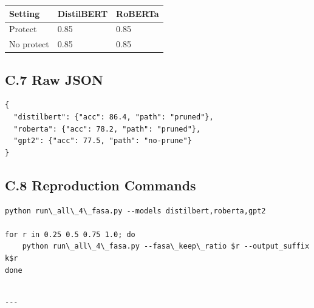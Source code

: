 \begin{table}[H]
\centering
\small
\begin{tabular}{lll}
\toprule
\textbf{Setting} & \textbf{DistilBERT} & \textbf{RoBERTa} \\
\midrule
Protect & 0.85 & 0.85 \\
No protect & 0.85 & 0.85 \\
\bottomrule
\end{tabular}
\end{table}

\subsection{C.7 Raw JSON}

\begin{lstlisting}
{
  "distilbert": {"acc": 86.4, "path": "pruned"},
  "roberta": {"acc": 78.2, "path": "pruned"},
  "gpt2": {"acc": 77.5, "path": "no-prune"}
}
\end{lstlisting}

\subsection{C.8 Reproduction Commands}

\begin{lstlisting}
python run\_all\_4\_fasa.py --models distilbert,roberta,gpt2

for r in 0.25 0.5 0.75 1.0; do
    python run\_all\_4\_fasa.py --fasa\_keep\_ratio $r --output_suffix k$r
done
\end{lstlisting}
\begin{lstlisting}

---
\end{lstlisting}